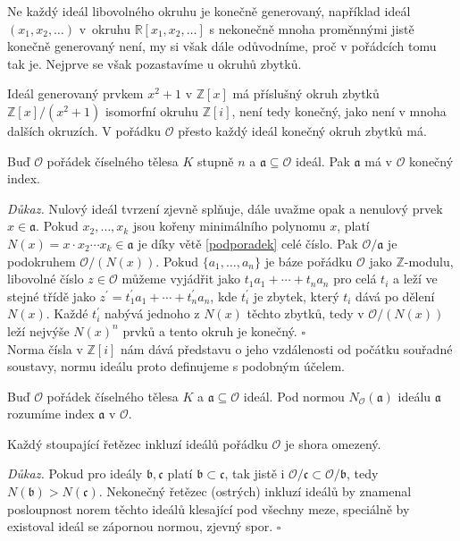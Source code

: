\documentclass[12pt]{report}
\begin{document}
Ne každý ideál libovolného okruhu je konečně generovaný, například ideál $(x_1,x_2,\dots)$ v~okruhu $\mathbb{R}[x_1,x_2,\dots]$ s nekonečně mnoha proměnnými jistě konečně generovaný není, my si však dále odůvodníme, proč v pořádcích tomu tak je. Nejprve se však pozastavíme u okruhů zbytků.

Ideál generovaný prvkem $x^2+1$ v $\mathbb{Z}[x]$ má příslušný okruh zbytků $\mathbb{Z}[x]/(x^2+1)$ isomorfní okruhu $\mathbb{Z}[i]$, není tedy konečný, jako není v mnoha dalších  okruzích. V pořádku $\mathcal{O}$ přesto každý ideál konečný okruh zbytků má.

\begin{veta}
Buď $\mathcal{O}$ pořádek číselného tělesa $K$ stupně $n$ a $\mathfrak{a} \subseteq \mathcal{O}$ ideál. Pak $\mathfrak{a}$ má v $\mathcal{O}$ konečný index.
\end{veta}
\noindent \textit{Důkaz.} Nulový ideál tvrzení zjevně splňuje, dále uvažme opak a nenulový prvek $x \in \mathfrak{a}$. Pokud $x_2,\dots,x_k$ jsou kořeny minimálního polynomu $x$, platí $N(x) = x \cdot x_2 \cdots x_k \in \mathfrak{a}$ je díky větě \ref{podporadek} celé číslo. Pak $\mathcal{O}/\mathfrak{a}$ je podokruhem $\mathcal{O}/(N(x))$. Pokud $\lbrace a_1,\dots,a_n \rbrace$ je báze pořádku $\mathcal{O}$ jako $\mathbb{Z}$-modulu, libovolné číslo $z \in \mathcal{O}$ můžeme vyjádřit jako $t_1 a_1 + \cdots + t_n a_n$ pro celá $t_i$ a leží ve stejné třídě jako $z^\prime = t_1 ^\prime a_1 + \cdots + t_n ^\prime a_n$, kde $t_i ^\prime$ je zbytek, který $t_i$ dává po dělení $N(x)$. Každé $t_i ^\prime$ nabývá jednoho z $N(x)$ těchto zbytků, tedy v $\mathcal{O}/(N(x))$ leží nejvýše $N(x)^n$ prvků a tento okruh je konečný. \hfill $\square$\\

Norma čísla v $\mathbb{Z}[i]$ nám dává představu o jeho vzdálenosti od počátku souřadné soustavy, normu ideálu proto definujeme s podobným účelem.
\begin{definice}
Buď $\mathcal{O}$ pořádek číselného tělesa $K$ a $\mathfrak{a} \subseteq \mathcal{O}$ ideál. Pod normou $N_{\mathcal{O}}(\mathfrak{a})$ ideálu $\mathfrak{a}$ rozumíme index $\mathfrak{a}$ v $\mathcal{O}$.
\end{definice}

\begin{veta}\label{noether}
Každý stoupající řetězec inkluzí ideálů pořádku $\mathcal{O}$ je shora omezený.
\end{veta}
\textit{Důkaz.} Pokud pro ideály $\mathfrak{b},\mathfrak{c}$ platí $\mathfrak{b} \subset \mathfrak{c}$, tak jistě i $\mathcal{O}/\mathfrak{c} \subset \mathcal{O}/\mathfrak{b}$, tedy $N(\mathfrak{b}) > N(\mathfrak{c})$. Nekonečný řetězec (ostrých) inkluzí ideálů by znamenal posloupnost norem těchto ideálů klesající pod všechny meze, speciálně by existoval ideál se zápornou normou, zjevný spor. \hfill $\square$\\
\end{document}
